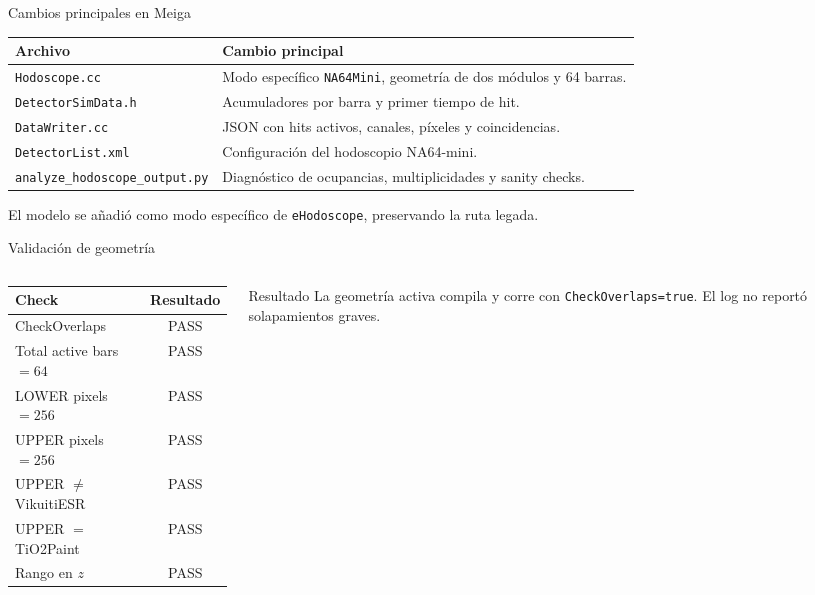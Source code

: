 \documentclass[aspectratio=169]{beamer}
\newcommand{\code}[1]{\texttt{\small #1}}
\newcommand{\ok}{\textcolor{green!45!black}{PASS}}
\begin{document}
\begin{frame}{Cambios principales en Meiga}
  \small
  \begin{tabular}{p{}p{}}
    \toprule
    Archivo & Cambio principal \\
    \midrule
    \code{Hodoscope.cc} & Modo específico \code{NA64Mini}, geometría de dos módulos y 64 barras. \\
    \code{DetectorSimData.h} & Acumuladores por barra y primer tiempo de hit. \\
    \code{DataWriter.cc} & JSON con hits activos, canales, píxeles y coincidencias. \\
    \code{DetectorList.xml} & Configuración del hodoscopio NA64-mini. \\
    \code{analyze\_hodoscope\_output.py} & Diagnóstico de ocupancias, multiplicidades y sanity checks. \\
    \bottomrule
  \end{tabular}
  \vspace{0.8em}

  El modelo se añadió como modo específico de \code{eHodoscope}, preservando la ruta legada.
\end{frame}

\begin{frame}{Validación de geometría}
  \begin{columns}[T]
    \begin{column}{0.52\textwidth}
      \begin{tabular}{lc}
        \toprule
        Check & Resultado \\
        \midrule
        CheckOverlaps & \ok \\
        Total active bars \(=64\) & \ok \\
        LOWER pixels \(=256\) & \ok \\
        UPPER pixels \(=256\) & \ok \\
        UPPER \(\neq\) VikuitiESR & \ok \\
        UPPER \(=\) TiO2Paint & \ok \\
        Rango en \(z\) & \ok \\
        \bottomrule
      \end{tabular}
    \end{column}
    \begin{column}{0.42\textwidth}
      \begin{block}{Resultado}
        La geometría activa compila y corre con \code{CheckOverlaps=true}.
        El log no reportó solapamientos graves.
      \end{block}
    \end{column}
  \end{columns}
\end{frame}
\end{document}
